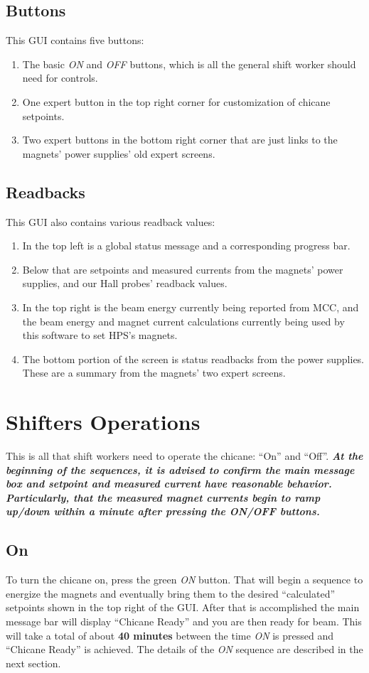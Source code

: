 \documentclass[amsmath,amssymb,notitlepage,11pt]{revtex4-1}
\begin{document}
\subsection{Buttons}
This GUI contains five buttons:
\begin{enumerate}
    \item The basic {\em ON} and {\em OFF} buttons, which is all the general shift worker should need for controls.
    \item One expert button in the top right corner for customization of chicane setpoints.
    \item Two expert buttons in the bottom right corner that are just links to the magnets' power supplies' old expert screens.
\end{enumerate}
\subsection{Readbacks}
This GUI also contains various readback values:
\begin{enumerate}
    \item In the top left is a global status message and a corresponding progress bar.
    \item Below that are setpoints and measured currents from the magnets' power supplies, and our Hall probes' readback values.
    \item In the top right is the beam energy currently being reported from MCC, and the beam energy and magnet current calculations currently being used by this software to set HPS's magnets.
    \item The bottom portion of the screen is status readbacks from the power supplies.  These are a summary from the magnets' two expert screens.
\end{enumerate}

\section{Shifters Operations}
This is all that shift workers need to operate the chicane:  ``On'' and ``Off''.  {\bf\em At the beginning of the sequences, it is advised to confirm the main message box and setpoint and measured current have reasonable behavior.  Particularly, that the measured magnet currents begin to ramp up/down within a minute after pressing the ON/OFF buttons.}
\subsection{On}
To turn the chicane on, press the green {\em ON} button.  That will begin a sequence to energize the magnets and eventually bring them to the desired ``calculated'' setpoints shown in the top right of the GUI.  After that is accomplished the main message bar will display ``Chicane Ready'' and you are then ready for beam.  This will take a total of about {\bf 40 minutes} between the time {\em ON} is pressed and ``Chicane Ready'' is achieved.  The details of the {\em ON} sequence are described in the next section.
\end{document}
